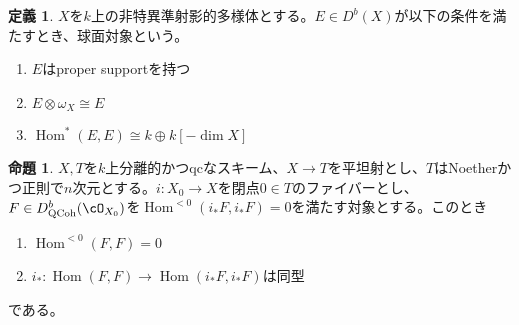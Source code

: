 \documentclass[uplatex, a4paper, dvipdfmx]{jsarticle}
\theoremstyle{definition}
\newtheorem{definition}[theorem]{定義}
\newtheorem{proposition}[theorem]{命題}
\DeclareMathOperator{\Hom}{\mathrm{Hom}}
\DeclareMathOperator{\QCoh}{\mathrm{QCoh}}
\begin{document}
\begin{definition}
    $X$を$k$上の非特異準射影的多様体とする。$E \in D^b(X)$が以下の条件を満たすとき、球面対象という。
    \begin{enumerate}
        \item $E$はproper supportを持つ
        \item $E \otimes \omega_X \cong E$
        \item $\Hom^*(E, E) \cong k \oplus k[-\dim X]$
    \end{enumerate}
\end{definition}


\begin{proposition}
    $X, T$を$k$上分離的かつqcなスキーム、$X \to T$を平坦射とし、$T$はNoetherかつ正則で$n$次元とする。$i \colon X_0 \to X$を閉点$0 \in T$のファイバーとし、$F \in D_{\QCoh}^b(\cO_{X_0})$を$\Hom^{<0}(i_*F, i_*F) = 0$を満たす対象とする。このとき
    \begin{enumerate}
        \item $\Hom^{<0}(F, F) = 0$
        \item $i_* \colon \Hom(F, F) \to \Hom(i_*F, i_*F)$は同型
    \end{enumerate}
    である。
\end{proposition}
\end{document}
